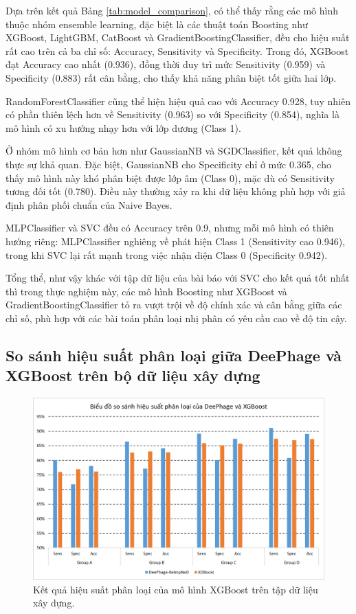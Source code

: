 Dựa trên kết quả Bảng \ref{tab:model_comparison}, có thể thấy rằng các mô hình thuộc nhóm ensemble learning, đặc biệt là các thuật toán Boosting như XGBoost, LightGBM, CatBoost và GradientBoostingClassifier, đều cho hiệu suất rất cao trên cả ba chỉ số: Accuracy, Sensitivity và Specificity. Trong đó, XGBoost đạt Accuracy cao nhất (0.936), đồng thời duy trì mức Sensitivity (0.959) và Specificity (0.883) rất cân bằng, cho thấy khả năng phân biệt tốt giữa hai lớp.

RandomForestClassifier cũng thể hiện hiệu quả cao với Accuracy 0.928, tuy nhiên có phần thiên lệch hơn về Sensitivity (0.963) so với Specificity (0.854), nghĩa là mô hình có xu hướng nhạy hơn với lớp dương (Class 1).

Ở nhóm mô hình cơ bản hơn như GaussianNB và SGDClassifier, kết quả không thực sự khả quan. Đặc biệt, GaussianNB cho Specificity chỉ ở mức 0.365, cho thấy mô hình này khó phân biệt được lớp âm (Class 0), mặc dù có Sensitivity tương đối tốt (0.780). Điều này thường xảy ra khi dữ liệu không phù hợp với giả định phân phối chuẩn của Naive Bayes.

MLPClassifier và SVC đều có Accuracy trên 0.9, nhưng mỗi mô hình có thiên hướng riêng: MLPClassifier nghiêng về phát hiện Class 1 (Sensitivity cao 0.946), trong khi SVC lại rất mạnh trong việc nhận diện Class 0 (Specificity 0.942).

Tổng thể, như vậy khác với tập dữ liệu của bài báo với SVC cho kết quả tốt nhất thì trong thực nghiệm này, các mô hình Boosting như XGBoost và GradientBoostingClassifier tỏ ra vượt trội về độ chính xác và cân bằng giữa các chỉ số, phù hợp với các bài toán phân loại nhị phân có yêu cầu cao về độ tin cậy. 

\subsection{So sánh hiệu suất phân loại giữa DeePhage và XGBoost trên bộ dữ liệu xây dựng}

\begin{figure}[H]
    \centering
    \includegraphics[width=1\linewidth]{figures/result_deephage_vs_xgboost.png}
    \caption{Kết quả hiệu suất phân loại của mô hình XGBoost trên tập dữ liệu xây dựng.}
    \label{fig:result_2}
\end{figure}

